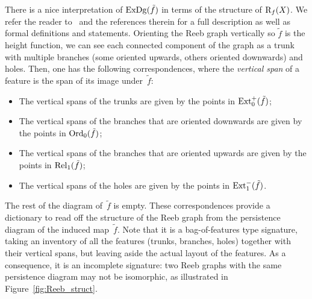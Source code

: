 There is a nice interpretation of $\mathrm{ExDg}(\tilde f)$ in terms of the
structure of $\mathrm{R}_f(X)$. 
We refer the reader to~\cite{Bauer14} and
the references therein for a full description as well as formal definitions
and statements.  Orienting the Reeb graph vertically so ${\tilde f}$ is the height function,
we can see each connected component of the graph as a trunk with
multiple branches (some oriented upwards, others oriented downwards)
and holes.  Then,
one has the following correspondences, where the
{\em vertical span} of a feature is the span of its image under~$\tilde f$:
%
\begin{itemize}
\item The vertical spans of the trunks are given by the points in $\mathrm{Ext}_0^+(\tilde f)$;
\item The vertical spans of the branches that are oriented downwards are given by the points in $\mathrm{Ord}_0(\tilde f)$;
\item The vertical spans of the branches that are oriented upwards are given by the points in $\mathrm{Rel}_1(\tilde f)$;
\item The vertical spans of the holes are given by the points in $\mathrm{Ext}_1^-(\tilde f)$. 
\end{itemize}
%
The rest of the diagram of~$\tilde f$ is empty. These correspondences
provide a dictionary to read off the structure of the Reeb graph from
the persistence diagram of the induced map~$\tilde f$. Note that it
is a bag-of-features type signature, taking an inventory of all
the features (trunks, branches, holes) together with their vertical
spans, but leaving aside the actual layout of the features. As a
consequence, it is an incomplete signature: two Reeb graphs with the
same persistence diagram may not be isomorphic, as illustrated in
Figure~\ref{fig:Reeb_struct}.

